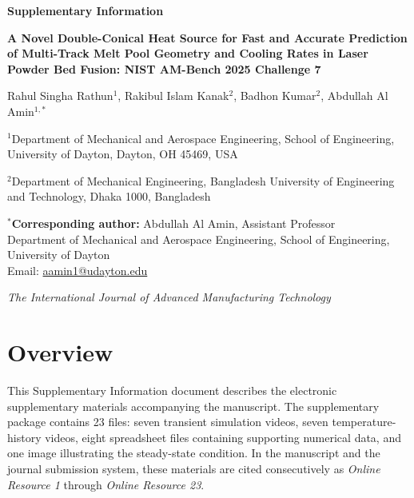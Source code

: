 \documentclass[11pt]{article}
\begin{document}
\begin{center}
{\Large\bfseries Supplementary Information}

\vspace{0.55cm}

{\large\bfseries
A Novel Double-Conical Heat Source for Fast and Accurate Prediction of Multi-Track Melt Pool Geometry and Cooling Rates in Laser Powder Bed Fusion: NIST AM-Bench 2025 Challenge 7
}

\vspace{0.65cm}

Rahul Singha Rathun$^{1}$,
Rakibul Islam Kanak$^{2}$,
Badhon Kumar$^{2}$,
Abdullah Al Amin$^{1,*}$

\vspace{0.45cm}

$^{1}$Department of Mechanical and Aerospace Engineering,
School of Engineering, University of Dayton,
Dayton, OH 45469, USA

\vspace{0.20cm}

$^{2}$Department of Mechanical Engineering,
Bangladesh University of Engineering and Technology,
Dhaka 1000, Bangladesh

\vspace{0.45cm}

$^{*}$\textbf{Corresponding author:} Abdullah Al Amin, Assistant Professor\\
Department of Mechanical and Aerospace Engineering, School of Engineering,
University of Dayton\\
Email: \href{mailto:aamin1@udayton.edu}{aamin1@udayton.edu}

\vspace{0.45cm}

\textit{The International Journal of Advanced Manufacturing Technology}
\end{center}

\vspace{0.6cm}

\section*{Overview}

This Supplementary Information document describes the electronic
supplementary materials accompanying the manuscript. The supplementary
package contains 23 files: seven transient simulation videos, seven
temperature-history videos, eight spreadsheet files containing supporting
numerical data, and one image illustrating the steady-state condition.
In the manuscript and the journal submission system, these materials are
cited consecutively as \textit{Online Resource 1} through
\textit{Online Resource 23}.
\end{document}
